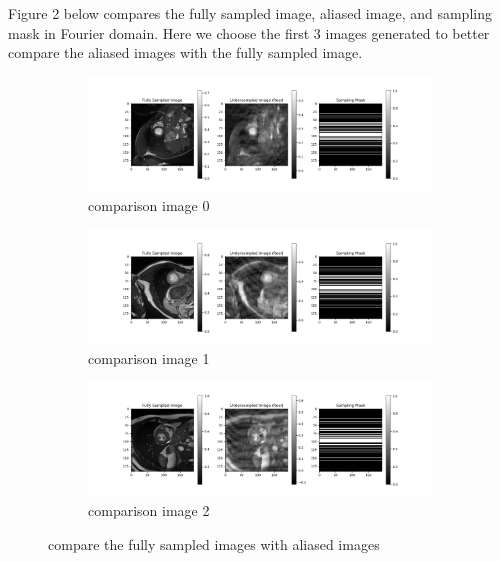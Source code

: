 \documentclass{article}
\begin{document}
Figure 2 below compares the fully sampled image, aliased image, and sampling mask in Fourier domain. 
Here we choose the first 3 images generated to better compare the aliased images with the fully sampled image.

\begin{figure}[ht]
  \centering
  \begin{subfigure}[b]{\linewidth}
    \includegraphics[width=\linewidth]{../comparison_image_0.png}
    \caption{comparison image 0}
    \label{fig:comparison_image_0}
  \end{subfigure}
  \quad
  \begin{subfigure}[b]{\linewidth}
    \includegraphics[width=\linewidth]{../comparison_image_1.png}
    \caption{comparison image 1}
    \label{fig:comparison_image_1}
  \end{subfigure}
  \quad
  \begin{subfigure}[b]{\linewidth}
    \includegraphics[width=\linewidth]{../comparison_image_2.png}
    \caption{comparison image 2}
    \label{fig:comparison_image_2}
  \end{subfigure}
  \caption{compare the fully sampled images with aliased images}
\end{figure}
\end{document}
